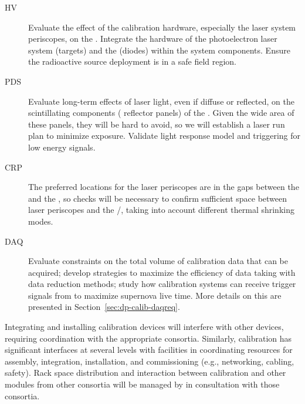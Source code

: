 \begin{description}
    \item[HV] Evaluate the effect of the calibration hardware, especially the laser system periscopes, on the \efield. 
    Integrate the hardware of the %
    photoelectron laser system (targets) and the  (diodes) within the  system components. Ensure the radioactive source deployment is in a safe field region.
    \item[PDS] Evaluate long-term effects of laser light, even if diffuse or reflected, on the scintillating components ( reflector panels) of the . Given the wide area of these panels, they will be hard to avoid, so we will establish a laser run plan to minimize exposure. Validate light response model and triggering for low energy signals. 
     \item[CRP] The preferred locations for the laser periscopes are in the gaps between the  and the , so checks will be necessary to confirm sufficient space between laser periscopes and the /, taking into account different thermal shrinking modes.
     \item[DAQ] Evaluate  constraints on the total volume of calibration data that can be acquired; develop strategies to maximize the efficiency of data taking with data reduction methods; study how calibration systems can receive trigger signals from  to maximize supernova live time. More details on this are presented in Section~\ref{sec:dp-calib-daqreq}.
  
\end{description}

Integrating and installing calibration devices will interfere with other devices, requiring coordination with the appropriate consortia. Similarly, calibration has significant interfaces at several levels with facilities in coordinating resources for assembly, integration, installation, and commissioning (e.g., networking, cabling, safety). Rack space distribution and interaction between calibration and other modules from other consortia will be managed by  in consultation with those consortia.

